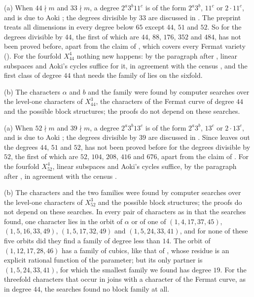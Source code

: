 \begin{remark}\label{rem:new44}
(a) When $44\nmid m$ and $33\nmid m$, a degree $2^{a}3^{b}11^{c}$ is of the
form $2^{a}3^{b}$, $11^{c}$ or $2\cdot11^{c}$, and  is
due to Aoki \cite{Aok87,Aok00}; the degrees divisible by $33$ are discussed
in . The preprint \cite{MMRV26} treats all dimensions in
every degree below $65$ except $44$, $51$ and $52$. So for the degrees
divisible by $44$, the first of which are $44$, $88$, $176$, $352$ and $484$,
 has not been proved before, apart from the claim of
\cite{OAI26}, which covers every Fermat variety (). For the
fourfold $X^{4}_{44}$ nothing new happens: by the paragraph after
, linear subspaces and Aoki's cycles suffice for it, in
agreement with the census \cite{Jum26b}, and the first class of degree $44$
that needs the family of  lies on the sixfold.

(b) The characters $\alpha$ and $b$ and the family were found by computer
searches over the level-one characters of $X^{3}_{44}$, the characters of the
Fermat curve of degree $44$ and the possible block structures; the proofs do
not depend on these searches.
\end{remark}

\begin{remark}\label{rem:new52}
(a) When $52\nmid m$ and $39\nmid m$, a degree $2^{a}3^{b}13^{c}$ is of the
form $2^{a}3^{b}$, $13^{c}$ or $2\cdot13^{c}$, and  is
due to Aoki \cite{Aok87,Aok00}; the degrees divisible by $39$ are discussed
in . Since \cite{MMRV26} leaves out the degrees $44$, $51$
and $52$,  has not been proved before for the degrees
divisible by $52$, the first of which are $52$, $104$, $208$, $416$ and
$676$, apart from the claim of \cite{OAI26}. For the fourfold $X^{4}_{52}$,
linear subspaces and Aoki's cycles suffice, by the paragraph after
, in agreement with the census \cite{Jum26b}.

(b) The characters and the two families were found by computer searches
over the level-one characters of $X^{3}_{52}$ and the possible block
structures; the proofs do not depend on these searches. In every pair of
characters as in  that the searches found, one character
lies in the orbit of $\alpha$ or of one of $(1,4,17,37,45)$,
$(1,5,16,33,49)$, $(1,5,17,32,49)$ and $(1,5,24,33,41)$, and for none of
these five orbits did they find a family of degree less than $14$. The
orbit of $(1,12,17,28,46)$ has a family of cubics, like that of
, whose residue is an explicit rational function of the
parameter; but its only partner is $(1,5,24,33,41)$, for which the smallest
family we found has degree $19$. For the threefold characters that occur in
joins with a character of the Fermat curve, as in degree $44$, the searches
found no block family at all.
\end{remark}

